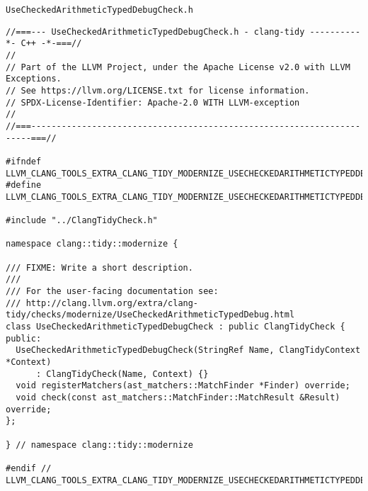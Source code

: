 \texttt{UseCheckedArithmeticTypedDebugCheck.h}
{\scriptsize
\begin{verbatim}
//===--- UseCheckedArithmeticTypedDebugCheck.h - clang-tidy ----------*- C++ -*-===//
//
// Part of the LLVM Project, under the Apache License v2.0 with LLVM Exceptions.
// See https://llvm.org/LICENSE.txt for license information.
// SPDX-License-Identifier: Apache-2.0 WITH LLVM-exception
//
//===----------------------------------------------------------------------===//

#ifndef LLVM_CLANG_TOOLS_EXTRA_CLANG_TIDY_MODERNIZE_USECHECKEDARITHMETICTYPEDDEBUGCHECK_H
#define LLVM_CLANG_TOOLS_EXTRA_CLANG_TIDY_MODERNIZE_USECHECKEDARITHMETICTYPEDDEBUGCHECK_H

#include "../ClangTidyCheck.h"

namespace clang::tidy::modernize {

/// FIXME: Write a short description.
///
/// For the user-facing documentation see:
/// http://clang.llvm.org/extra/clang-tidy/checks/modernize/UseCheckedArithmeticTypedDebug.html
class UseCheckedArithmeticTypedDebugCheck : public ClangTidyCheck {
public:
  UseCheckedArithmeticTypedDebugCheck(StringRef Name, ClangTidyContext *Context)
      : ClangTidyCheck(Name, Context) {}
  void registerMatchers(ast_matchers::MatchFinder *Finder) override;
  void check(const ast_matchers::MatchFinder::MatchResult &Result) override;
};

} // namespace clang::tidy::modernize

#endif // LLVM_CLANG_TOOLS_EXTRA_CLANG_TIDY_MODERNIZE_USECHECKEDARITHMETICTYPEDDEBUGCHECK_H

\end{verbatim}
}

